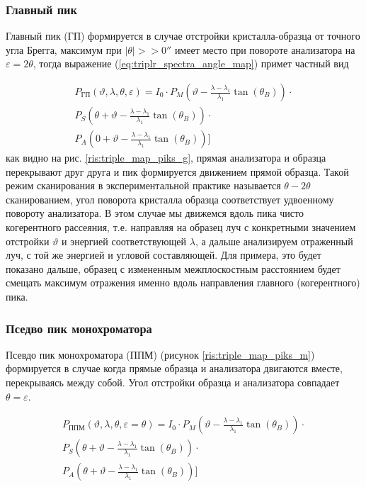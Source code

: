 \subsubsection*{Главный пик}
Главный пик (ГП) формируется в случае отстройки кристалла-образца от точного угла Брегга,
максимум при $|\theta|>>0''$ имеет место при повороте анализатора на $\varepsilon = 2\theta$,
тогда выражение (\ref{eq:triplr_spectra_angle_map}) примет частный вид

\begin{eqnarray} \label{eq:triplr_spectra_angle_map_GP}
  P_{\text{ГП}}(\vartheta,\lambda,\theta,\varepsilon) =I_0\cdot
    P_M \left(\vartheta - \frac{\lambda - \lambda_1}{\lambda_1}\tan(\theta_B) \right) \cdot \nonumber \\
   P_S \left(\theta + \vartheta - \frac{\lambda - \lambda_1}{\lambda_1}\tan(\theta_B)\right)  \cdot  \nonumber \\
   P_A \left(0+\vartheta - \frac{\lambda - \lambda_1}{\lambda_1}\tan(\theta_B)\right) \Bigg]
 \end{eqnarray}
как видно на рис. \ref{ris:triple_map_piks_g}, прямая анализатора и образца перекрывают друг друга и пик формируется
движением прямой образца. Такой режим сканирования в экспериментальной практике называется $\theta-2\theta$ сканированием,
угол поворота кристалла образца соответствует удвоенному повороту анализатора. В этом случае мы движемся
вдоль пика чисто когерентного рассеяния, т.е. направляя на образец луч с конкретными значением отстройки $\vartheta$ и энергией соответствующей
 $\lambda$, а дальше анализируем отраженный луч, с той же энергией и угловой составляющей. Для примера, это
 будет показано дальше, образец с измененным межплоскостным расстоянием будет смещать максимум отражения именно вдоль направления
 главного (когерентного) пика.

\subsubsection*{Пседво пик монохроматора}
Псевдо пик монохроматора (ППМ) (рисунок \ref{ris:triple_map_piks_m}) формируется в случае когда прямые образца и анализатора
двигаются вместе, перекрываясь между собой. Угол отстройки образца и анализатора совпадает $\theta = \varepsilon$.

\begin{eqnarray} \label{eq:triplr_spectra_angle_map_PPM}
  P_{\text{ППМ}}(\vartheta,\lambda,\theta,\varepsilon = \theta) =I_0\cdot
    P_M \left(\vartheta - \frac{\lambda - \lambda_1}{\lambda_1}\tan(\theta_B) \right) \cdot \nonumber \\
   P_S \left(\theta + \vartheta - \frac{\lambda - \lambda_1}{\lambda_1}\tan(\theta_B)\right)  \cdot  \nonumber \\
   P_A \left(\theta  + \vartheta - \frac{\lambda - \lambda_1}{\lambda_1}\tan(\theta_B)\right) \Bigg]
 \end{eqnarray}

